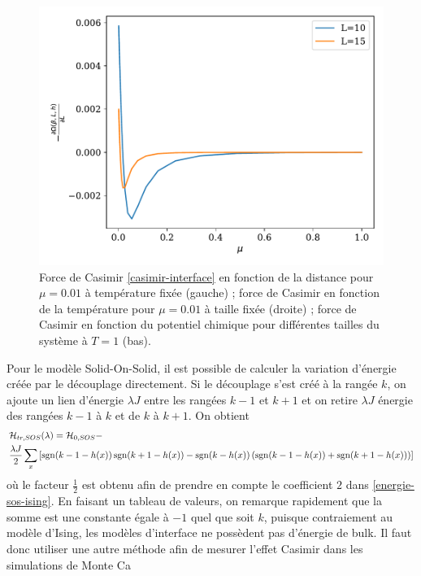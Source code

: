 \begin{figure}[t]
\begin{minipage}[t]{0.4\linewidth}
	\end{minipage}
	\centering
	\begin{minipage}[b]{0.4\linewidth}
    	\includegraphics[width=\linewidth]{chap4/casimir-mu-t1.pdf}
	\end{minipage}	
	\label{casimir-temperature}
	\caption{Force de Casimir \ref{casimir-interface} en fonction de la distance pour $\mu = 0.01$ à température fixée (gauche) ; force de Casimir en fonction de la température pour $\mu=0.01$ à taille fixée (droite) ; force de Casimir en fonction du potentiel chimique pour différentes tailles du système à $T=1$ (bas). }
\end{figure}
    
    


Pour le modèle Solid-On-Solid, il est possible de calculer la variation d'énergie créée par le découplage directement. Si le découplage s'est créé à la rangée $k$, on ajoute un lien d'énergie $\lambda J$ entre les rangées $k-1$ et $k+1$ et on retire $\lambda J$ énergie des rangées $k-1$ à $k$  et de $k$ à $k+1$. On obtient
\begin{align}
    &\mathcal{H}_{tr,SOS}(\lambda) = \mathcal{H}_{0,SOS} - \nonumber \\
     &\frac{\lambda J}{2} \sum_x \left[ \operatorname{sgn}(k-1-h(x)) \operatorname{sgn}(k+1-h(x)) - \operatorname{sgn}(k-h(x)) \left( \operatorname{sgn}(k-1-h(x))+\operatorname{sgn}(k+1-h(x)) \right) \right]
\end{align}
où le facteur $\frac{1}{2}$ est obtenu afin de prendre en compte le coefficient $2$ dans \ref{energie-sos-ising}. En faisant un tableau de valeurs, on remarque rapidement que la somme est une constante égale à $-1$ quel que soit $k$, puisque contraiement au modèle d'Ising, les modèles d'interface ne possèdent pas d'énergie de bulk. Il faut donc utiliser une autre méthode afin de mesurer l'effet Casimir dans les simulations de Monte Ca    
